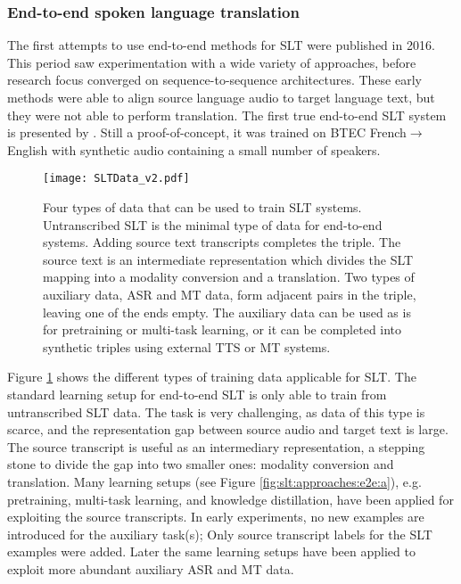 \documentclass{svjour3}
\newcommand{\lp}[2]{#1$\rightarrow$#2}
\begin{document}
\subsubsection{End-to-end spoken language translation}
\label{sec:slt:endtoend}



The first attempts to use end-to-end methods for SLT were published in 2016.
This period saw experimentation with a wide variety of approaches,
before research focus converged on sequence-to-sequence architectures.
These early methods
\citep{duong-etal-2016-attentional,anastasopoulos-etal-2016-unsupervised,bansal-etal-2017-towards}
were able to align source language audio to target language text,
but they were not able to perform translation.
The first true end-to-end SLT system is presented by \citet{berard2016listen}.
Still a proof-of-concept,
it was trained on BTEC \lp{French}{English} with synthetic audio containing a small number of speakers.





\begin{figure}[t]
    \centering
    \texttt{[image: SLTData\_v2.pdf]}
    \caption{Four types of data that can be used to train SLT systems. Untranscribed SLT is the minimal type of data for end-to-end systems. Adding source text transcripts completes the triple. The source text is an intermediate representation which divides the SLT mapping into a modality conversion and a translation. Two types of auxiliary data, ASR and MT data, form adjacent pairs in the triple, leaving one of the ends empty. The auxiliary data can be used as is for pretraining or multi-task learning, or it can be completed into synthetic triples using external TTS or MT systems.
    \label{fig:slt:typesofdata}}
\end{figure}



Figure \ref{fig:slt:typesofdata} shows the different types of training data applicable for SLT.
The standard learning setup for end-to-end SLT is only able to train from untranscribed SLT data.
The task is very challenging, as data of this type is scarce, and the representation gap between source audio and target text is large.
The source transcript is useful as an intermediary representation, a stepping stone to divide the gap into two smaller ones:
modality conversion and translation.
Many learning setups (see Figure \ref{fig:slt:approaches:e2e:a}),
e.g. pretraining, multi-task learning, and knowledge distillation,
have been applied for exploiting the source transcripts.
In early experiments,
no new examples are introduced for the auxiliary task(s);
Only source transcript labels for the SLT examples were added.
Later the same learning setups have been applied to exploit more abundant auxiliary ASR and MT data.
\end{document}
